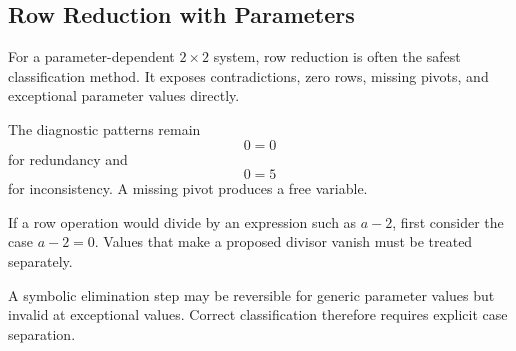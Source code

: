 \subsection{Row Reduction with Parameters}

For a parameter-dependent $2\times2$ system, row reduction is often the safest classification method. It exposes contradictions, zero rows, missing pivots, and exceptional parameter values directly.

The diagnostic patterns remain
\[
0=0
\]
for redundancy and
\[
0=5
\]
for inconsistency. A missing pivot produces a free variable.

\begin{remarkbox}
If a row operation would divide by an expression such as $a-2$, first consider the case $a-2=0$. Values that make a proposed divisor vanish must be treated separately.
\end{remarkbox}

A symbolic elimination step may be reversible for generic parameter values but invalid at exceptional values. Correct classification therefore requires explicit case separation.